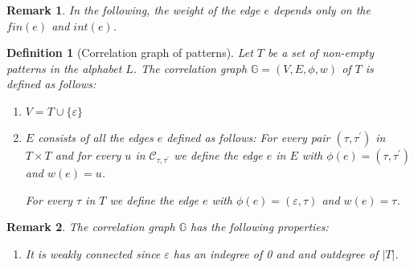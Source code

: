 \documentclass[12pt]{report}
\newtheorem*{remark}{Remark}
\newtheorem{defn}[mythm]{Definition}
\begin{document}
{\begin{remark}
In the following, the weight of the edge $e$ depends only on the $fin(e)$ and $int(e)$.
\end{remark}

\begin{defn}[Correlation graph of patterns]
Let $T$ be a set of non-empty patterns in the alphabet $L$. The correlation graph $\mathbb{G}=(V,E,\phi,w)$ of $T$ is defined as follows: 
\begin{enumerate}[label=\roman{*})]

\item $V=T\cup\{\varepsilon\}$ 

\item $E$ consists of all the edges $e$ defined as follows: For every pair $(\tau, \tau^{\prime})$ in $T \times T$ and for every $u$ in $\mathcal{C}_{\tau,\tau^{\prime}}$ we define the edge $e$ in $E$ with $\phi(e) = (\tau,\tau^{\prime})$ and $w(e)=u$. 

For every $\tau$ in $T$ we define the edge $e$ with $\phi(e)= (\varepsilon,\tau)$ and $w(e)=\tau$. 

\end{enumerate}
\end{defn}




\begin{remark} The correlation graph $\mathbb{G}$ has the following properties:
\begin{enumerate}[label=\roman{*})]
\item It is weakly connected since $\varepsilon$ has an indegree of 0 and and outdegree of $|T|$.


\end{enumerate}
\end{remark}}
\end{document}
